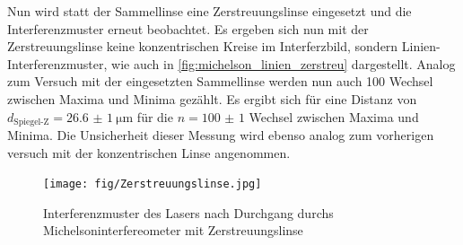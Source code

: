 \documentclass[ngerman]{scrartcl}
\begin{document}
Nun wird statt der Sammellinse eine Zerstreuungslinse eingesetzt und die Interferenzmuster erneut beobachtet. Es ergeben sich nun mit der Zerstreuungslinse keine konzentrischen Kreise im Interferzbild, sondern Linien-Interferenzmuster, wie auch in \autoref{fig:michelson_linien_zerstreu} dargestellt. 
Analog zum Versuch mit der eingesetzten Sammellinse werden nun auch 100 Wechsel zwischen Maxima und Minima gezählt. Es ergibt sich für eine Distanz von $d_\text{Spiegel-Z} = \SI{26.6(10)}{\micro\meter}$ für die $n = \num{100(1)}$ Wechsel zwischen Maxima und Minima. Die Unsicherheit dieser Messung wird ebenso analog zum vorherigen versuch mit der konzentrischen Linse angenommen. 
\begin{figure}[H]
    \centering
    \begin{samepage}
        \texttt{[image: fig/Zerstreuungslinse.jpg]}
        \caption{Interferenzmuster des Lasers nach Durchgang durchs Michelsoninterfereometer mit Zerstreuungslinse}
        \label{fig:michelson_linien_zerstreu}
    \end{samepage}
\end{figure}
\end{document}
